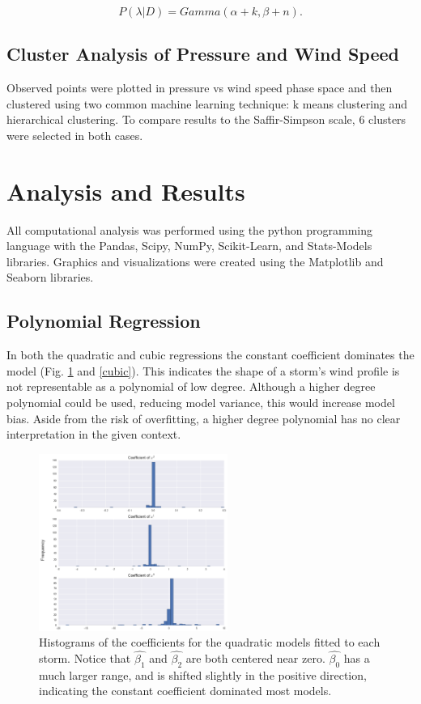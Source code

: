 \documentclass{article}
\begin{document}
		\begin{equation}
			P(\lambda | D) = Gamma(\alpha + k, \beta + n).
		\end{equation}
		

	\subsection{Cluster Analysis of Pressure and Wind Speed}
	Observed points were plotted in pressure vs wind speed phase space and then clustered using two common machine learning technique: k means clustering and hierarchical clustering. To compare results to the Saffir-Simpson scale\cite{}, 6 clusters were selected in both cases.

	\section{Analysis and Results}
		 All computational analysis was performed using the python programming language with the Pandas, Scipy, NumPy, Scikit-Learn, and Stats-Models libraries\cite{mckinney2010data, scipy, walt2011numpy, scikit-learn, statsmodels2010}. Graphics and visualizations were created using the Matplotlib and Seaborn libraries\cite{hunter2007matplotlib, michael_waskom_2014_12710}.
		 
	\subsection{Polynomial Regression}
	In both the quadratic and cubic regressions the constant coefficient dominates the model (Fig. \ref{quadratic} and \ref{cubic}). This indicates the shape of a storm's wind profile is not representable as a polynomial of low degree. Although a higher degree polynomial could be used, reducing model variance, this would increase model bias. Aside from the risk of overfitting, a higher degree polynomial has no clear interpretation in the given context.

	\begin{figure}[H]
			\centering
			\includegraphics[width=0.55\textwidth]{images/quadratic.png}
		\caption{Histograms of the coefficients for the quadratic models fitted to each storm. Notice that $\hat{\beta_1}$ and $\hat{\beta_2}$ are both centered near zero. $\hat{\beta_0}$ has a much larger range, and is shifted slightly in the positive direction, indicating the constant coefficient dominated most models.}
		\label{quadratic}
	\end{figure}
	
\end{document}
